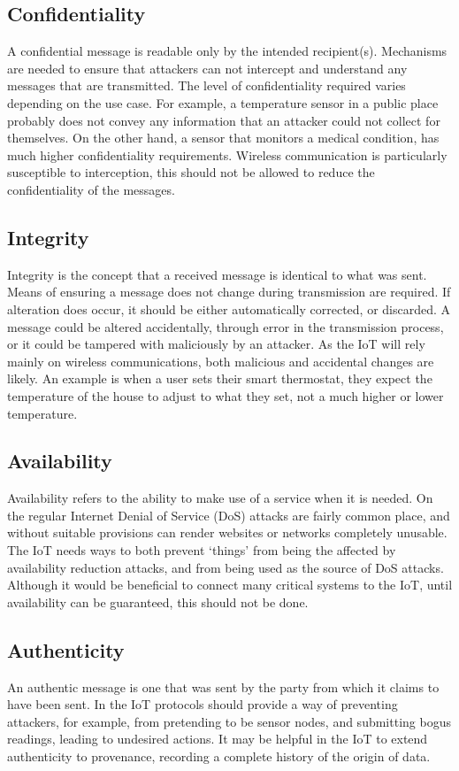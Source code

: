 \documentclass[10pt,journal,compsoc]{IEEEtran}
\begin{document}
\subsection{Confidentiality}
A confidential message is readable only by the intended recipient(s).
Mechanisms are needed to ensure that attackers can not intercept and understand
any messages that are transmitted. The level of confidentiality required varies
depending on the use case. For example, a temperature sensor in a public place
probably does not convey any information that an attacker could not collect for
themselves. On the other hand, a sensor that monitors a medical condition, has
much higher confidentiality requirements. Wireless communication is
particularly susceptible to interception, this should not be allowed to reduce
the confidentiality of the messages.  

\subsection{Integrity}
Integrity is the concept that a received message is identical to what was sent.
Means of ensuring a message does not change during transmission are required.
If alteration does occur, it should be either automatically corrected, or
discarded. A message could be altered accidentally, through error in the
transmission process, or it could be tampered with maliciously by an attacker.
As the IoT will rely mainly on wireless communications, both malicious and
accidental changes are likely. An example is when a user sets their smart
thermostat, they expect the temperature of the house to adjust to what they
set, not a much higher or lower temperature.  

\subsection{Availability}
Availability refers to the ability to make use of a service when it is needed.
On the regular Internet Denial of Service (DoS) attacks are fairly common
place, and without suitable provisions can render websites or networks
completely unusable. The IoT needs ways to both prevent `things' from being the
affected by availability reduction attacks, and from being used as the source of DoS
attacks. Although it would be beneficial to connect many critical systems to
the IoT, until availability can be guaranteed, this should not be done.

\subsection{Authenticity}
An authentic message is one that was sent by the party from which it claims to
have been sent. In the IoT protocols should provide a way of preventing
attackers, for example, from pretending to be sensor nodes, and submitting
bogus readings, leading to undesired actions. It may be helpful in the IoT to
extend authenticity to provenance, recording a complete history of the origin
of data.  
\end{document}
